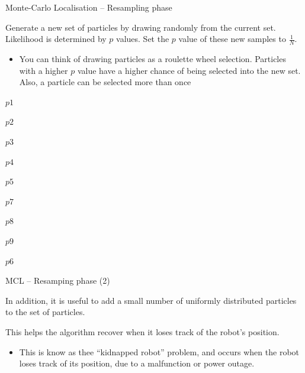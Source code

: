 \documentclass[compress]{beamer}
\begin{document}
\begin{frame}{Monte-Carlo Localisation -- Resampling phase}

Generate a new set of particles by drawing randomly from the current
set. Likelihood is determined by $p$ values. Set the $p$ value
    of these new samples to $\frac{1}{N}$.

\begin{itemize}
\item You can think of drawing particles as a roulette wheel selection.
  Particles with a higher $p$ value have a higher chance of being
  selected into the new set. Also, a particle can be selected more than
  once
\end{itemize}

$p1$

$p2$

$p3$

$p4$

$p5$

$p7$

$p8$

$p9$

$p6$

\end{frame}

\begin{frame}{MCL -- Resamping phase (2)}

In addition, it is useful to add a small number of uniformly distributed
particles to the set of particles.

This helps the algorithm recover when it loses track of the robot's
position.

\begin{itemize}
\item This is know as thee ``kidnapped robot'' problem, and occurs when the
  robot loses track of its position, due to a malfunction or power
  outage.
\end{itemize}

\end{frame}
\end{document}
